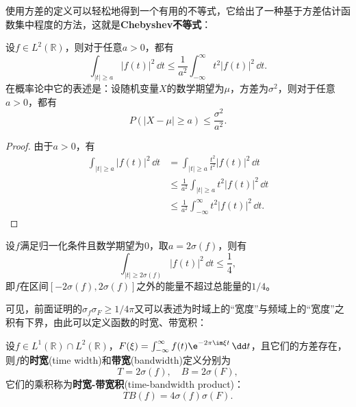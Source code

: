 使用方差的定义可以轻松地得到一个有用的不等式，它给出了一种基于方差估计函数集中程度的方法，这就是\textbf{Chebyshev不等式}：
\begin{theorem}[Chebyshev不等式]
    设$f\in L^2(\mathbb{R})$，则对于任意$a>0$，都有
    \begin{equation}
        \int_{|t|\geq a}|f(t)|^2\,\dd t\leq \frac{1}{a^2}\int_{-\infty}^{\infty}t^2|f(t)|^2\,\dd t.
    \end{equation}
    在概率论中它的表述是：设随机变量$X$的数学期望为$\mu$，方差为$\sigma^2$，则对于任意$a>0$，都有
    \begin{equation}
        P(|X-\mu|\geq a)\leq \frac{\sigma^2}{a^2}.
    \end{equation}
\end{theorem}
\begin{proof}
    由于$a>0$，有
    \begin{align}
        \int_{|t|\geq a}|f(t)|^2\,\dd t&=\int_{|t|\geq a}\frac{t^2}{t^2}|f(t)|^2\,\dd t \nonumber \\
        &\leq \frac{1}{a^2}\int_{|t|\geq a}t^2|f(t)|^2\,\dd t \nonumber \\
        &\leq \frac{1}{a^2}\int_{-\infty}^{\infty}t^2|f(t)|^2\,\dd t.
    \end{align}
\end{proof}

\begin{example}
    设$f$满足归一化条件且数学期望为$0$，取$a=2\sigma(f)$，则有
    \begin{equation}
        \int_{|t|\geq 2\sigma(f)}|f(t)|^2\,\dd t\leq \frac{1}{4},
    \end{equation}
    即$f$在区间$[-2\sigma(f),2\sigma(f)]$之外的能量不超过总能量的$1/4$。
\end{example}
可见，前面证明的$\sigma_f \sigma_F\geq 1/4\pi$又可以表述为时域上的“宽度”与频域上的“宽度”之积有下界，由此可以定义函数的时宽、带宽积：
\begin{definition}[时宽-带宽积]
    设$f\in L^1(\mathbb{R})\cap L^2(\mathbb{R})$，$F(\xi)=\int_{-\infty}^{\infty}f(t)\e^{-2\pi\im\xi t}\,\dd t$，且它们的方差存在，则$f$的\textbf{时宽}(time width)和\textbf{带宽}(bandwidth)定义分别为
    \begin{equation}
        T=2\sigma(f),\quad B=2\sigma(F),
    \end{equation}
    它们的乘积称为\textbf{时宽-带宽积}(time-bandwidth product)：
    \begin{equation}
        TB(f)=4\sigma(f)\sigma(F).
    \end{equation}
\end{definition}

